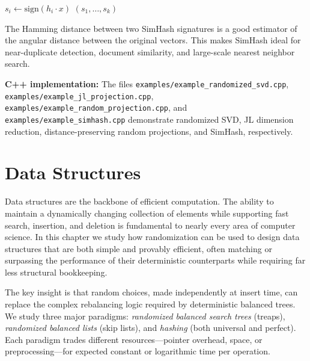 \documentclass[twoside,12pt]{book}
\theoremstyle{plain}
\theoremstyle{definition}
\theoremstyle{remark}
\newenvironment{cpplisting}{\begin{center}\small}{\end{center}}
\begin{document}
\begin{algorithm}[htbp]
\caption{SimHash}
\label{alg:simhash}
\begin{algorithmic}[1]
    \State $s_i \gets \text{sign}(h_i \cdot x)$ 
  \EndFor
  \State \Return $(s_1, \ldots, s_k)$
\EndFunction
\end{algorithmic}
\end{algorithm}

The Hamming distance between two SimHash signatures is a good estimator of the angular distance between the original vectors. This makes SimHash ideal for near-duplicate detection, document similarity, and large-scale nearest neighbor search.

\begin{cpplisting}
\textbf{C++ implementation:} The files \texttt{examples/example\_randomized\_svd.cpp}, \texttt{examples/example\_jl\_projection.cpp}, \texttt{examples/example\_random\_projection.cpp}, and \texttt{examples/example\_simhash.cpp} demonstrate randomized SVD, JL dimension reduction, distance-preserving random projections, and SimHash, respectively.
\end{cpplisting}

\chapter{Data Structures}
\label{ch:data-structures}

Data structures are the backbone of efficient computation. The ability to maintain a dynamically changing collection of elements while supporting fast search, insertion, and deletion is fundamental to nearly every area of computer science. In this chapter we study how randomization can be used to design data structures that are both simple and provably efficient, often matching or surpassing the performance of their deterministic counterparts while requiring far less structural bookkeeping.

The key insight is that random choices, made independently at insert time, can replace the complex rebalancing logic required by deterministic balanced trees. We study three major paradigms: \emph{randomized balanced search trees} (treaps), \emph{randomized balanced lists} (skip lists), and \emph{hashing} (both universal and perfect). Each paradigm trades different resources---pointer overhead, space, or preprocessing---for expected constant or logarithmic time per operation.
\end{document}
